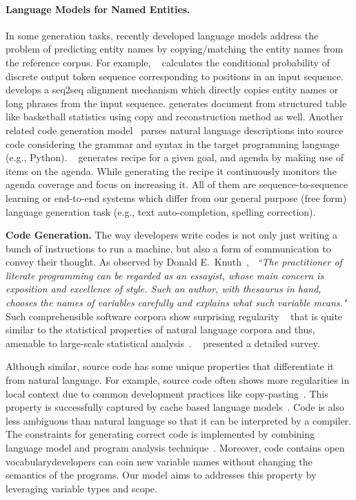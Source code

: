 \documentclass[11pt,a4paper]{article}
\begin{document}
\paragraph{\bf Language Models for Named Entities.} 
In some generation tasks, recently developed language models address the problem of predicting entity names  by copying/matching the entity  names  from  the  reference  corpus. For example, ~  calculates the conditional probability of discrete output token sequence  corresponding to positions in an input sequence. ~ develops a seq2seq alignment mechanism which directly copies entity names or long phrases from the input sequence.  generates document from  structured table like basketball statistics using copy and reconstruction method as well. Another related code generation model~\cite{cmu_code_gen}  parses natural language descriptions into source code considering the grammar and syntax in the target programming language  (e.g., Python). ~ generates recipe for a given goal, and agenda by making use of items on the agenda. While generating the recipe it continuously monitors the agenda coverage and focus on increasing it. All of them are sequence-to-sequence learning or end-to-end systems which differ from our general purpose  (free form) language generation task (e.g., text auto-completion, spelling correction). 







\textbf{Code Generation.} The way developers write codes is not only just writing a bunch of instructions to run a machine, but also a form of communication to convey their thought. As observed by Donald E.~Knuth~\cite{knuth1992literate}, ~\textit{``The practitioner of literate programming can be regarded as an essayist, whose main concern is exposition and excellence of style. Such an author, with thesaurus in hand, chooses the names of variables carefully and explains what such variable means."} Such comprehensible software corpora show surprising regularity ~\cite{ray2014uniqueness,gabel2010study} that is quite similar to the statistical properties of natural language corpora and thus, amenable to large-scale statistical analysis~\cite{hindle2012naturalness}. ~\cite{allamanis2017survey} presented a detailed survey.

Although similar, source code has some unique properties that differentiate it from natural language. For example, source code often shows more regularities in local context due to common development practices like copy-pasting~\cite{gharehyazie2017some,kim2005empirical}. This property is successfully captured by cache based language models~\cite{deep_net_for_source_code,tu2014localness}. 
Code is also less ambiguous than natural language so that it can be interpreted by a compiler. The constraints for generating correct code is implemented by combining language model and program analysis technique~\cite{raychev2014code}. Moreover, code contains open vocabulary\textemdash developers can coin new variable names without changing the semantics of the programs. Our model aims to addresses this property by leveraging variable types and scope.
\end{document}
